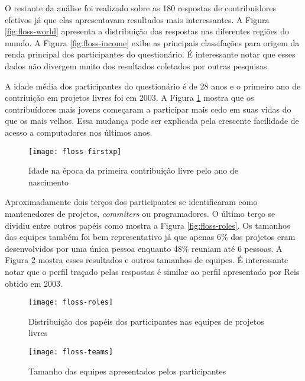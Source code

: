 
O restante da análise foi realizado sobre as 180 respostas de
contribuidores efetivos já que elas apresentavam resultados mais
interessantes. A Figura \ref{fig:floss-world} apresenta a distribuição
das respostas nas diferentes regiões do mundo. A Figura
\ref{fig:floss-income} exibe as principais classifações para origem da
renda principal dos participantes do questionário. É interessante
notar que esses dados não divergem muito dos resultados coletados por
outras pesquisas.

A idade média dos participantes do questionário é de 28 anos e o
primeiro ano de contriuição em projetos livres foi em 2003. A Figura
\ref{fig:floss-firstxp} mostra que os contribuídores mais jovens começaram
a participar mais cedo em suas vidas do que os mais velhos. Essa
mudança pode ser explicada pela crescente facilidade de acesso a
computadores nos últimos anos.

\begin{figure}
  \centering
  \texttt{[image: floss-firstxp]}
  \caption{Idade na época da primeira contribuição livre pelo ano de
    nascimento}
  \label{fig:floss-firstxp}
\end{figure}

Aproximadamente dois terços dos participantes se identificaram como
mantenedores de projetos, \textit{commiters} ou programadores. O
último terço se dividiu entre outros papéis como mostra a Figura
\ref{fig:floss-roles}. Os tamanhos das equipes também foi bem
representativo já que apenas 6\% dos projetos eram desenvolvidos por
uma única pessoa enquanto 48\% reuniam até 6 pessoas. A Figura
\ref{fig:floss-teams} mostra esses resultados e outros tamanhos de
equipes. É interessante notar que o perfil traçado pelas respostas é
similar ao perfil apresentado por Reis \cite{Reis2003} obtido em 2003.

\begin{figure}[htb]
  \begin{minipage}[t]{0.55\linewidth}
    \centering
    \texttt{[image: floss-roles]}
    \caption{Distribuição dos papéis dos participantes nas equipes de
      projetos livres}
    \label{fig:floss-roles}
  \end{minipage}
  \begin{minipage}[t]{0.45\linewidth}
    \centering
    \texttt{[image: floss-teams]}
    \caption{Tamanho das equipes apresentados pelos participantes}
    \label{fig:floss-teams}
  \end{minipage}
\end{figure}

